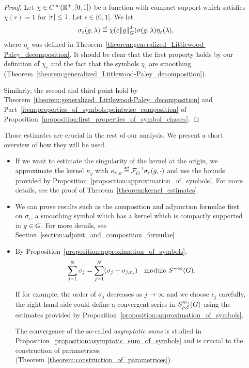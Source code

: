 \begin{proof}
    Let $\chi \in {C^\infty(\mathbb{R}^+, [0, 1])}$ be a function with compact support
    which satisfies $\chi(r) = 1$ for $\left|{r}\right| \leq 1$.
    Let $\epsilon \in (0, 1]$.
    We let
    \begin{align*}
        \sigma_\epsilon(g, \lambda)
        \defeq \chi(\epsilon \norm [\Group] g^2) \sigma(g, \lambda) \eta_\epsilon(\lambda),
    \end{align*}
    where $\eta_\epsilon$ was defined in Theorem~\ref{theorem:generalized_Littlewood-Paley_decomposition}.
    It should be clear that the first property holds by our definition of $\chi_\epsilon$
    and the fact that the symbols $\eta_\epsilon$ are smoothing (Theorem~\ref{theorem:generalized_Littlewood-Paley_decomposition}).

    Similarly,
    the second and third point hold by Theorem~\ref{theorem:generalized_Littlewood-Paley_decomposition}
    and Part~\ref{item:properties_of_symbols:pointwise_composition} of Proposition~\ref{proposition:first_properties_of_symbol_classes}.
\end{proof}

Those estimates are crucial in the rest of our analysis.
We present a short overview of how they will be used.

\begin{itemize}
    \item
        If we want to estimate the singularity of the kernel at the origin,
        we approximate the kernel $\kappa_g$ with $\kappa_{\epsilon, g} \defeq \InverseFourier \sigma_\epsilon(g, \dummy)$
        and use the bounds provided by Proposition~\ref{proposition:approximation_of_symbols}.
        For more details, see the proof of Theorem~\ref{theorem:kernel_estimates}.
    \item
        We can prove results such as the composition and adjunction formulae first on $\sigma_\epsilon$,
        a smoothing symbol which has a kernel which is compactly supported in $g \in G$.
        For more details, see Section~\ref{section:adjoint_and_composition_formulae}
    \item
        By Proposition~\ref{proposition:approximation_of_symbols},
        \begin{align*}
            \sum_{j = 1}^N \sigma_j
            = \sum_{j = 1}^N (\sigma_j - \sigma_{j, \varepsilon_j})
            \quad \text{modulo } {S^{-\infty} (G)}.
        \end{align*}

        If for example,
        the order of $\sigma_j$ decreases as $j \to \infty$ and we choose $\epsilon_j$ carefully,
        the right-hand side could define a convergent series in $S^{m_1}_{\rho, \delta}(G)$
        using the estimates provided by Proposition~\ref{proposition:approximation_of_symbols}.

        The convergence of the so-called \emph{asymptotic sums} is studied in Proposition~\ref{proposition:asymptotic_sum_of_symbols}
        and is crucial to the construction of parametrices (Theorem~\ref{theorem:construction_of_parametrices}).
\end{itemize}

